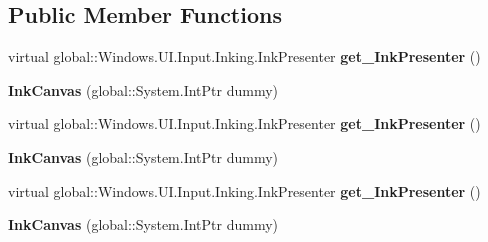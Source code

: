 \subsection*{Public Member Functions}
\begin{DoxyCompactItemize}
\item 
\mbox{\label{class_windows_1_1_u_i_1_1_xaml_1_1_controls_1_1_ink_canvas_a6675fa3e25c9c181f970ee5a2f4794c3}} 
virtual global\+::\+Windows.\+U\+I.\+Input.\+Inking.\+Ink\+Presenter {\bfseries get\+\_\+\+Ink\+Presenter} ()
\item 
\mbox{\label{class_windows_1_1_u_i_1_1_xaml_1_1_controls_1_1_ink_canvas_a1cadc07ba4ba58f6af6e5c7795bece94}} 
{\bfseries Ink\+Canvas} (global\+::\+System.\+Int\+Ptr dummy)
\item 
\mbox{\label{class_windows_1_1_u_i_1_1_xaml_1_1_controls_1_1_ink_canvas_a6675fa3e25c9c181f970ee5a2f4794c3}} 
virtual global\+::\+Windows.\+U\+I.\+Input.\+Inking.\+Ink\+Presenter {\bfseries get\+\_\+\+Ink\+Presenter} ()
\item 
\mbox{\label{class_windows_1_1_u_i_1_1_xaml_1_1_controls_1_1_ink_canvas_a1cadc07ba4ba58f6af6e5c7795bece94}} 
{\bfseries Ink\+Canvas} (global\+::\+System.\+Int\+Ptr dummy)
\item 
\mbox{\label{class_windows_1_1_u_i_1_1_xaml_1_1_controls_1_1_ink_canvas_a6675fa3e25c9c181f970ee5a2f4794c3}} 
virtual global\+::\+Windows.\+U\+I.\+Input.\+Inking.\+Ink\+Presenter {\bfseries get\+\_\+\+Ink\+Presenter} ()
\item 
\mbox{\label{class_windows_1_1_u_i_1_1_xaml_1_1_controls_1_1_ink_canvas_a1cadc07ba4ba58f6af6e5c7795bece94}} 
{\bfseries Ink\+Canvas} (global\+::\+System.\+Int\+Ptr dummy)
\item 
\mbox{\label{class_windows_1_1_u_i_1_1_xaml_1_1_controls_1_1_ink_canvas_a6675fa3e25c9c181f970ee5a2f4794c3}} 

\end{DoxyCompactItemize}
